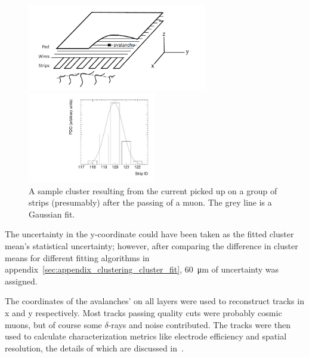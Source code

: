 \begin{figure}
    \centering
    \includegraphics[width = 0.7\textwidth]{figures/mwpc_lefebvre_thesis_gatti.png}
    \caption{A sketch of an sTGC-like detector. The position of the avalanche could be extracted from the wires and strips that picked up the avalanche signal. The signals on individual strips are sketched. Clustering was the processs of fitting a Gaussian to the peak value of the signals on individual contiguous strips, as is done in figure~\ref{fig:sample_cluster}. In this work, the x(y)-coordinate will always refer to the coordinate perpendicular to the wires (strips)~\cite{lefebvre_thesis, gatti_optimum_1979}.}
    \label{fig:mwpc_coords}
    \vspace*{\floatsep}
    \centering
    \includegraphics[width = 0.5\textwidth]{figures/sample_cluster_QL2C04_event5_layer2.pdf}
    \caption{A sample cluster resulting from the current picked up on a group of strips (presumably) after the passing of a muon. The grey line is a Gaussian fit.}
    \label{fig:sample_cluster}
\end{figure}

The uncertainty in the y-coordinate could have been taken as the fitted cluster mean's statistical uncertainty; however, after comparing the difference in cluster means for different fitting algorithms in appendix~\ref{sec:appendix_clustering_cluster_fit}, \SI{60}{\micro\meter} of uncertainty was assigned.

The coordinates of the avalanches' on all layers were used to reconstruct tracks in x and y respectively. Most tracks passing quality cuts were probably cosmic muons, but of course some $\delta$-rays and noise contributed. The tracks were then used to calculate characterization metrics like electrode efficiency and spatial resolution, the details of which are discussed in~\cite{lefebvre_thesis}.

